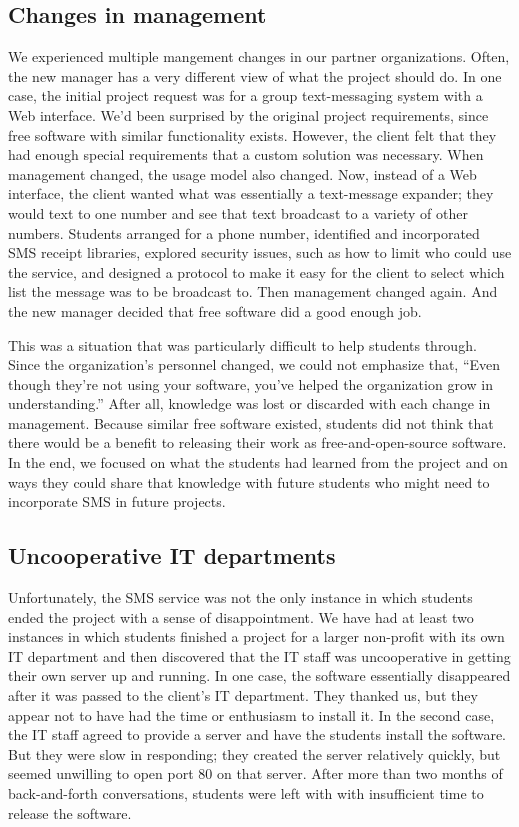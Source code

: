 \subsection{Changes in management}

We experienced multiple mangement changes in our partner organizations.
Often, the new manager has a
very different view of what the project should do.  In one case,
the initial project request was for a group text-messaging system
with a Web interface.  We'd been surprised by the original project
requirements, since free software with similar functionality exists.
However, the client felt that they had enough special requirements
that a custom solution was necessary.  When management changed, the
usage model also changed.  Now, instead of a Web interface,
the client wanted what was essentially a text-message expander;
they would text to one number and see that text broadcast to a
variety of other numbers.  Students arranged for a phone number,
identified and incorporated SMS receipt libraries, explored security
issues, such as how to limit who could use the service, and designed
a protocol to make it easy for the client to select which list the
message was to be broadcast to.  Then management changed again.  And
the new manager decided that free software did a good enough job.

This was a situation that was particularly difficult to help students
through.  Since the organization's personnel changed, 
we could not emphasize that, 
``Even though they're not using your software, you've helped the
organization grow in understanding.'' After all, knowledge was lost or
discarded with each change in management.
Because similar
free software existed, students did not think that there would be
a benefit to releasing their work as free-and-open-source software.
In the end, we focused on what the students had learned from the project
and on ways they could share that knowledge with future students
who might need to incorporate SMS in future projects.

\subsection{Uncooperative IT departments}

Unfortunately, the SMS service was not the only instance in which
students ended the project with a sense of disappointment.  We have
had at least two instances in which students finished a project for
a larger non-profit with its own IT department and then discovered that
the IT staff was uncooperative in getting their own server up and
running.  In one case, the software essentially disappeared after
it was passed to the client's IT department.  They thanked us,
but they appear not to have had the time or enthusiasm to install
it.  In the second case, the IT staff agreed to provide a server
and have the students install the software.  But they were
slow in responding; they created the server relatively quickly, but
seemed unwilling to open port 80 on that server.  After more than two
months of back-and-forth conversations, 
students were left with with insufficient time to release the software.

